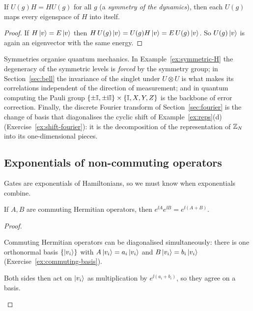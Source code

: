 \begin{proposition}\label{prop:sym-energy}
  If $U(g)H=HU(g)$ for all $g$ (a \emph{symmetry of the dynamics}), then each $U(g)$ maps every eigenspace of $H$ into itself.
\end{proposition}
\begin{proof}
  If $H\left|v\right\rangle=E\left|v\right\rangle$ then $H\,U(g)\left|v\right\rangle=U(g)H\left|v\right\rangle=E\,U(g)\left|v\right\rangle$. So $U(g)\left|v\right\rangle$ is again an eigenvector with the same energy. \qedhere
\end{proof}

\begin{lookahead}
  Symmetries organise quantum mechanics. In Example~\ref{ex:symmetric-H} the degeneracy of the symmetric levels is \emph{forced} by the symmetry group; in Section~\ref{sec:bell} the invariance of the singlet under $U\otimes U$ is what makes its correlations independent of the direction of measurement; and in quantum computing the Pauli group $\{\pm\mathbb{I},\pm\mathrm{i}\mathbb{I}\}\times\{\mathbb{I},X,Y,Z\}$ is the backbone of error correction. Finally, the discrete Fourier transform of Section~\ref{sec:fourier} is the change of basis that diagonalises the cyclic shift of Example~\ref{ex:reps}(d) (Exercise~\ref{ex:shift-fourier}): it is the decomposition of the representation of $\mathbb{Z}_N$ into its one-dimensional pieces.
\end{lookahead}

\subsection{Exponentials of non-commuting operators}

Gates are exponentials of Hamiltonians, so we must know when exponentials combine.

\begin{proposition}\label{prop:commuting-exp}
  If $A,B$ are commuting Hermitian operators, then $e^{\ii A}e^{\ii B}=e^{\ii(A+B)}$.
\end{proposition}
\begin{proof}
  \begin{steps}
    \item Commuting Hermitian operators can be diagonalised simultaneously: there is one orthonormal basis $\{\left|v_i\right\rangle\}$ with $A\left|v_i\right\rangle=a_i\left|v_i\right\rangle$ and $B\left|v_i\right\rangle=b_i\left|v_i\right\rangle$ (Exercise~\ref{ex:commuting-basis}).
    \item Both sides then act on $\left|v_i\right\rangle$ as multiplication by $e^{\ii(a_i+b_i)}$, so they agree on a basis. \qedhere
  \end{steps}
\end{proof}


